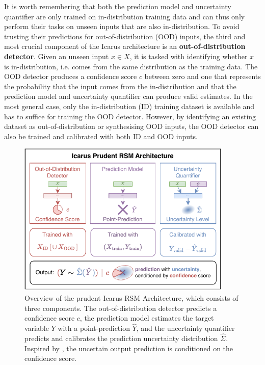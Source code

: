 It is worth remembering that both the prediction model and uncertainty quantifier are only trained on in-distribution training data and can thus only perform their tasks on unseen inputs that are also in-distribution. To avoid trusting their predictions for out-of-distribution (OOD) inputs, the third and most crucial component of the Icarus architecture is an \textcolor{icarus-confidence}{\textbf{out-of-distribution detector}}. Given an unseen input $x \in X$, it is tasked with identifying whether $x$ is in-distribution, i.e. comes from the same distribution as the training data. The OOD detector produces a confidence score \textcolor{icarus-confidence}{$c$} between zero and one that represents the probability that the input comes from the in-distribution and that the prediction model and uncertainty quantifier can produce valid estimates. In the most general case, only the in-distribution (ID) training dataset is available and has to suffice for training the OOD detector. However, by identifying an existing dataset as out-of-distribution or synthesising OOD inputs, the OOD detector can also be trained and calibrated with both ID and OOD inputs.

\begin{figure}[H]
    \centering
    \includegraphics[width=0.915\textwidth]{icarus/figures/icarus-rsm.pdf}
    \caption[Overview of the prudent Icarus RSM Architecture]{Overview of the prudent Icarus RSM Architecture, which consists of three components. The out-of-distribution detector predicts a confidence score \textcolor{icarus-confidence}{$c$}, the prediction model estimates the target variable $Y$ with a point-prediction \textcolor{icarus-prediction}{$\hat{Y}$}, and the uncertainty quantifier predicts and calibrates the prediction uncertainty distribution \textcolor{icarus-uncertainty}{$\hat{\Sigma}$}. Inspired by \textcite{learning-ood-confidence-2018}, the uncertain output prediction is conditioned on the confidence score.}
    \label{fig:icarus-rsm}
\end{figure}

